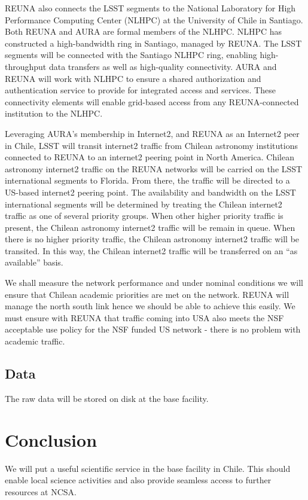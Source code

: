 REUNA also connects the LSST segments to the National Laboratory for High Performance Computing Center (NLHPC) at the University of Chile in Santiago.  Both REUNA and AURA are formal members of the NLHPC.  NLHPC has constructed a high-bandwidth ring in Santiago, managed by REUNA.  The LSST segments will be connected with the Santiago NLHPC ring, enabling high-throughput data transfers as well as high-quality connectivity.  AURA and REUNA will work with NLHPC to ensure a shared authorization and authentication service to provide for integrated access and services.  These connectivity elements will enable grid-based access from any REUNA-connected institution to the NLHPC.

Leveraging AURA’s membership in Internet2, and REUNA as an Internet2 peer in Chile, LSST will transit internet2 traffic from Chilean astronomy institutions connected to REUNA to an internet2 peering point in North America.  Chilean astronomy internet2 traffic on the REUNA networks will be carried on the LSST international segments to Florida.  From there, the traffic will be directed to a US-based internet2 peering point.  The availability and bandwidth on the LSST international segments will be determined by treating the Chilean internet2 traffic as one of several priority groups.  When other higher priority traffic is present, the Chilean astronomy internet2 traffic will be remain in queue.  When there is no higher priority traffic, the Chilean astronomy internet2 traffic will be transited.  In this way, the Chilean internet2 traffic will be transferred on an “as available” basis.

We shall measure the network performance and under nominal conditions we will ensure that Chilean academic priorities are met on the network. REUNA will manage the north south link hence we should be able to achieve this easily.  We must ensure with REUNA that traffic coming into USA also meets the NSF acceptable use policy for the NSF funded US network - there is no problem with academic traffic.


\subsection{Data }

The raw data will be stored on disk at the base facility.



\section{Conclusion}
We will put a useful scientific service in the base facility in Chile. This should enable local science activities and also provide seamless access to further resources at NCSA.
